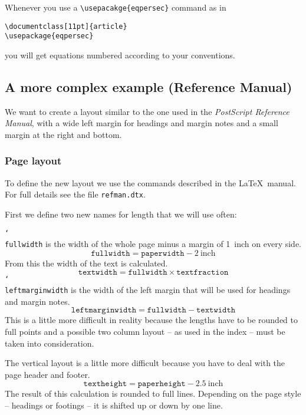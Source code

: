 \documentclass[twoside,a4paper]{refart}
\DeclareRobustCommand\cs[1]{\texttt{\char`\\#1}}
\begin{document}
Whenever you use a \verb|\usepacakge{eqpersec}| command as in
\nopagebreak
\begin{verbatim}
\documentclass[11pt]{article}
\usepackage{eqpersec}
\end{verbatim}
you will get equations numbered according to your conventions.



\subsection{A more complex example (Reference Manual)}
\label{refmanex}

We want to create a layout similar to the one used in the \textit{PostScript 
Reference Manual}, with a wide left margin for headings and margin 
notes and a small margin at the right and bottom.

\subsubsection{Page layout}

To define the new layout we use the commands described in the \LaTeX\ 
manual. For full details see the file \texttt{refman.dtx}.


First we define two new names for length that we will use often:

\cs{fullwidth} is the width of the whole page minus a margin of 1~inch 
on every side. 
%
\begin{displaymath}
\texttt{fullwidth} = \texttt{paperwidth} - 2\ \textrm{inch}
\end{displaymath}
%
From this the width of the text is calculated.
%
\begin{displaymath}
\texttt{textwidth} = \texttt{fullwidth} \times \texttt{textfraction}
\end{displaymath}
%
\cs{leftmarginwidth} is the width of the left margin that will be 
used for headings and margin notes. 
\begin{displaymath}
\texttt{leftmarginwidth} = \texttt{fullwidth} - \texttt{textwidth}
\end{displaymath}
%
This is a little more difficult in reality because the lengths have to 
be rounded to full points and a possible two column layout -- as used 
in the index -- must be taken into consideration.

The vertical layout is a little more difficult because you have to 
deal with the page header and footer. 
%
\begin{displaymath}
\texttt{textheight} = \texttt{paperheight} - 2.5\ \textrm{inch}
\end{displaymath}
%
The result of this calculation is rounded to full lines. Depending on 
the page style -- headings or footings -- it is shifted up or down by one 
line.
\end{document}
